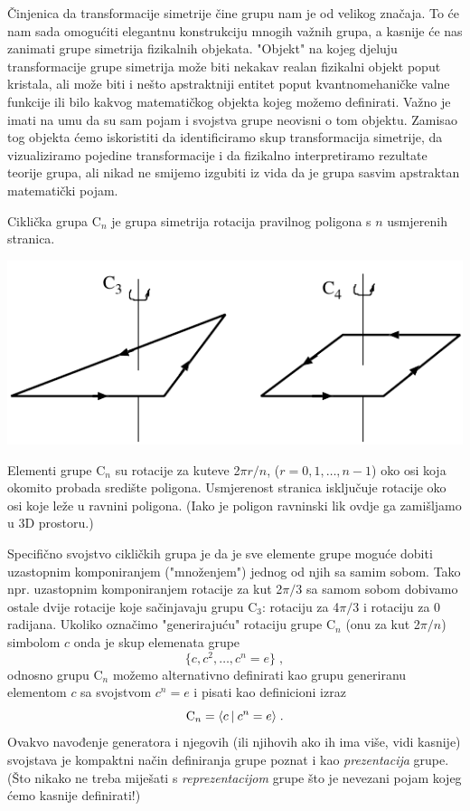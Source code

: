 Činjenica da transformacije simetrije čine grupu nam je od velikog
značaja. To će nam sada omogućiti elegantnu konstrukciju mnogih važnih
grupa, a kasnije će nas zanimati grupe simetrija fizikalnih
objekata.
"Objekt" na kojeg djeluju transformacije grupe simetrija može biti
nekakav realan fizikalni objekt poput kristala, ali može biti i
nešto apstraktniji entitet poput kvantnomehaničke valne funkcije
ili bilo kakvog matematičkog objekta kojeg možemo definirati.
Važno je imati na umu da su sam pojam i svojstva grupe neovisni o
tom objektu. Zamisao tog objekta ćemo iskoristiti da identificiramo skup transformacija
simetrije, da vizualiziramo pojedine transformacije i da
fizikalno interpretiramo rezultate teorije grupa, ali nikad
ne smijemo izgubiti iz vida da je grupa sasvim apstraktan matematički pojam.


\begin{primjer}
Ciklička grupa C$_n$ je grupa simetrija rotacija pravilnog poligona s $n$
usmjerenih stranica.
\end{primjer}

\centerline{\includegraphics[scale=1.0]{pics/Cn}}

Elementi grupe C$_n$ su rotacije za kuteve 2$\pi r/n$, ($r=0,1,\ldots, n-1$)
oko osi koja okomito probada središte poligona. Usmjerenost
stranica isključuje rotacije oko osi koje leže u ravnini poligona. 
(Iako je poligon ravninski lik ovdje ga zamišljamo u 3D prostoru.)

Specifično svojstvo cikličkih grupa je da je sve elemente grupe moguće
dobiti uzastopnim komponiranjem ("množenjem") jednog od njih sa samim sobom.
Tako npr. uzastopnim komponiranjem rotacije za kut 2$\pi/3$ sa samom sobom dobivamo ostale
dvije rotacije koje sačinjavaju grupu C$_3$: rotaciju za 4$\pi/3$ i
rotaciju za 0 radijana. 
Ukoliko označimo "generirajuću" rotaciju grupe C$_n$ (onu za kut 2$\pi/n$) simbolom 
$c$ onda je skup elemenata grupe
\begin{equation}
 \{c,c^2, \ldots , c^n=e \} \;,
\label{eq:cn}
\end{equation}
odnosno grupu C$_n$ možemo alternativno definirati kao grupu generiranu
elementom $c$ sa svojstvom $c^n=e$ i pisati kao definicioni izraz
\begin{equation}
 {\rm C}_n = \langle c \: | \: c^n=e \rangle \;.
\label{eq:cngp}
\end{equation}
Ovakvo navođenje generatora i njegovih (ili njihovih ako ih ima više, vidi kasnije)
svojstava je kompaktni način definiranja grupe poznat i kao \emph{prezentacija}
grupe. (Što nikako ne treba miješati s \emph{reprezentacijom} grupe što je nevezani
pojam kojeg ćemo kasnije definirati!)


